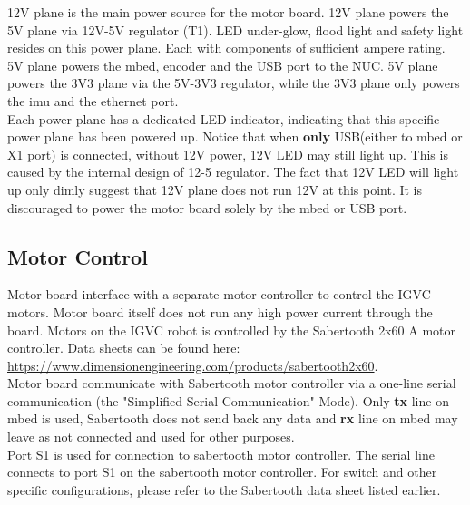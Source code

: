 \documentclass[letterpaper, 12pt]{article}
\begin{document}
12V plane is the main power source for the motor board. 12V plane powers the 5V plane via 12V-5V regulator (T1). LED under-glow, flood light and safety light resides on this power plane. Each with components of sufficient ampere rating. \\

5V plane powers the mbed, encoder and the USB port to the NUC. 5V plane powers the 3V3 plane via the 5V-3V3 regulator, while the 3V3 plane only powers the imu and the ethernet port. \\


Each power plane has a dedicated LED indicator, indicating that this specific power plane has been powered up. Notice that when \textbf{only} USB(either to mbed or X1 port) is connected, without 12V power, 12V LED may still light up. This is caused by the internal design of 12-5 regulator. The fact that 12V LED will light up only dimly suggest that 12V plane does not run 12V at this point. It is discouraged to power the motor board solely by the mbed or USB port.

\subsection{Motor Control}
Motor board interface with a separate motor controller to control the IGVC motors. Motor board itself does not run any high power current through the board. Motors on the IGVC robot is controlled by the Sabertooth 2x60 A motor controller. Data sheets can be found here: \url{https://www.dimensionengineering.com/products/sabertooth2x60}.\\

Motor board communicate with Sabertooth motor controller via a one-line serial communication (the "Simplified Serial Communication" Mode). Only \textbf{tx} line on mbed is used, Sabertooth does not send back any data and \textbf{rx} line on mbed may leave as not connected and used for other purposes.\\

Port S1 is used for connection to sabertooth motor controller. The serial line connects to port S1 on the sabertooth motor controller. For switch and other specific configurations, please refer to the Sabertooth data sheet listed earlier. \\
\end{document}
